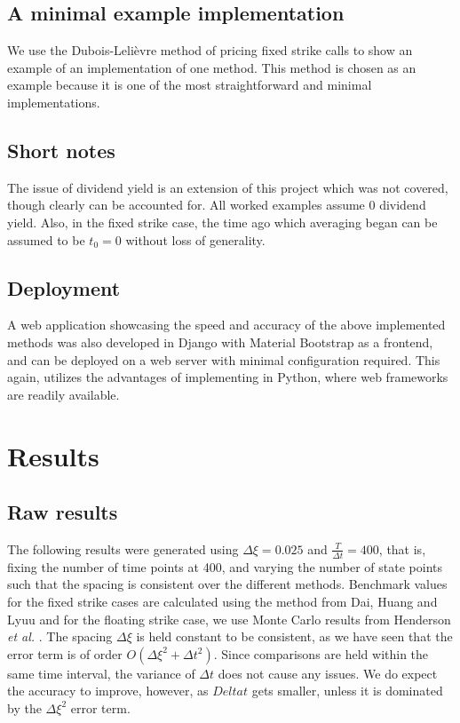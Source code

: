 \documentclass{article}
\begin{document}
\scriptsize

\normalsize

\subsection{A minimal example implementation}

We use the Dubois-Leli\`{e}vre method of pricing fixed strike calls to show an example of an implementation of one method. This method is chosen as an example because it is one of the most straightforward and minimal implementations.
\scriptsize

\normalsize

\subsection{Short notes}
The issue of dividend yield is an extension of this project which was not covered, though clearly can be accounted for. All worked examples assume 0 dividend yield. Also, in the fixed strike case, the time ago which averaging began can be assumed to be \(t_0 = 0\) without loss of generality.

\subsection{Deployment}
A web application showcasing the speed and accuracy of the above implemented methods was also developed in Django with Material Bootstrap as a frontend, and can be deployed on a web server with minimal configuration required. This again, utilizes the advantages of implementing in Python, where web frameworks are readily available.

\section{Results}

\subsection{Raw results}
The following results were generated using \(\Delta\xi = 0.025\) and \(\frac{T}{\Delta t} = 400\), that is, fixing the number of time points at 400, and varying the number of state points such that the spacing is consistent over the different methods. Benchmark values for the fixed strike cases are calculated using the method from Dai, Huang and Lyuu \cite{dai_et_al} and for the floating strike case, we use Monte Carlo results from Henderson \textit{et al.} \cite{henderson_et_al}. The spacing \(\Delta\xi\) is held constant to be consistent, as we have seen that the error term is of order \(O(\Delta\xi^2 + \Delta t^2)\). Since comparisons are held within the same time interval, the variance of \(\Delta t\) does not cause any issues. We do expect the accuracy to improve, however, as \(Delta t\) gets smaller, unless it is dominated by the \(\Delta\xi^2\) error term.
\end{document}
